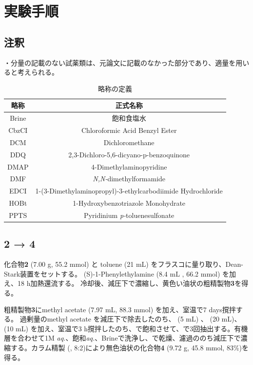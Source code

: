 \documentclass{ltjsarticle}
\theoremstyle{definition}
\numberwithin{equation}{section}
\begin{document}
\section{実験手順}
\subsection{注釈}
・分量の記載のない試薬類は、元論文に記載のなかった部分であり、適量を用いると考えられる。

\begin{table}[htp]
\caption{略称の定義}
\begin{center}
\begin{tabular}{cc }
\toprule
略称 & 正式名称 \\
\midrule
Brine & 飽和食塩水 \\
CbzCI & Chloroformic Acid Benzyl Ester\\
DCM & Dichloromethane \\
DDQ & 2,3-Dichloro-5,6-dicyano-p-benzoquinone \\
DMAP & 4-Dimethylaminopyridine\\
DMF & \textit{N,N-}dimethylformamide \\
EDCI & 1-(3-Dimethylaminopropyl)-3-ethylcarbodiimide Hydrochloride\\
HOBt & 1-Hydroxybenzotriazole Monohydrate \\
PPTS & Pyridinium \textit{p-}toluenesulfonate \\
\bottomrule
\end{tabular}
\end{center}
\label{default}
\end{table}%

\subsection{\textbf{2} → \textbf{4}}
化合物\textbf{2} (7.00  g, 55.2 mmol) と toluene (21 mL) をフラスコに量り取り、Dean-Stark装置をセットする。
(S)-1-Phenylethylamine (8.4 mL , 66.2 mmol) を加え、18 h加熱還流する。
冷却後、減圧下で濃縮し、黄色い油状の粗精製物\textbf{3}を得る。

粗精製物\textbf{3}にmethyl acetate (7.97 mL, 88.3 mmol) を加え、室温で7 days撹拌する。
過剰量のmethyl acetate を減圧下で除去したのち、 (5 mL) 、 (20 mL)、 (10 mL) を加え、室温で3 h撹拌したのち、で飽和させて、で3回抽出する。有機層を合わせて1M \textit{aq.}、飽和\textit{aq.}、Brineで洗浄し、で乾燥、濾過ののち減圧下で濃縮する。カラム精製 (, 8:2)により無色油状の化合物\textbf{4} (9.72 g, 45.8 mmol, 83\%)を得る。
\end{document}
